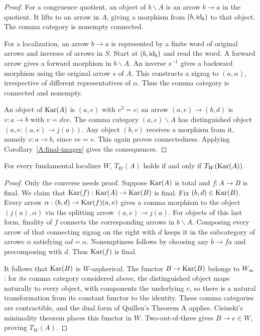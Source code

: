 \begin{proof}
For a congruence quotient, an object of $b\backslash A$ is an arrow $b\to a$ in the quotient. It lifts to an arrow in $A$, giving a morphism from $(b,\mathrm{id}_b)$ to that object. The comma category is nonempty connected.

For a localization, an arrow $b\to a$ is represented by a finite word of original arrows and inverses of arrows in $S$. Start at $(b,\mathrm{id}_b)$ and read the word. A forward arrow gives a forward morphism in $b\backslash A$. An inverse $s^{-1}$ gives a backward morphism using the original arrow $s$ of $A$. This constructs a zigzag to $(a,\alpha)$, irrespective of different representatives of $\alpha$. Thus the comma category is connected and nonempty.

An object of $\operatorname{Kar}(A)$ is $(a,e)$ with $e^2=e$; an arrow $(a,e)\to(b,d)$ is $v:a\to b$ with $v=dve$. The comma category $(a,e)\backslash A$ has distinguished object $(a,e:(a,e)\to j(a))$. Any object $(b,v)$ receives a morphism from it, namely $v:a\to b$, since $ve=v$. This again proves connectedness. Applying Corollary~\ref{A:final-images} gives the consequences.
\end{proof}

\begin{proposition}\label{B:karoubi}
For every fundamental localizer $W$, $T_W(A)$ holds if and only if $T_W(\operatorname{Kar}(A))$.
\end{proposition}

\begin{proof}
Only the converse needs proof. Suppose $\operatorname{Kar}(A)$ is total and $f:A\to B$ is final. We claim that $\operatorname{Kar}(f):\operatorname{Kar}(A)\to\operatorname{Kar}(B)$ is final. Fix $(b,d)\in\operatorname{Kar}(B)$. Every arrow $\alpha:(b,d)\to\operatorname{Kar}(f)(a,e)$ gives a comma morphism to the object $(j(a),\alpha)$ via the splitting arrow $(a,e)\to j(a)$. For objects of this last form, finality of $f$ connects the corresponding arrows in $b\backslash A$. Composing every arrow of that connecting zigzag on the right with $d$ keeps it in the subcategory of arrows $\alpha$ satisfying $\alpha d=\alpha$. Nonemptiness follows by choosing any $b\to fa$ and precomposing with $d$. Thus $\operatorname{Kar}(f)$ is final.

It follows that $\operatorname{Kar}(B)$ is $W$-aspherical. The functor $B\to\operatorname{Kar}(B)$ belongs to $W_{\infty}$: for its comma category considered above, the distinguished object maps naturally to every object, with components the underlying $v$, so there is a natural transformation from its constant functor to the identity. These comma categories are contractible, and the dual form of Quillen's Theorem A applies. Cisinski's minimality theorem places this functor in $W$. Two-out-of-three gives $B\to e\in W$, proving $T_W(A)$.
\end{proof}

